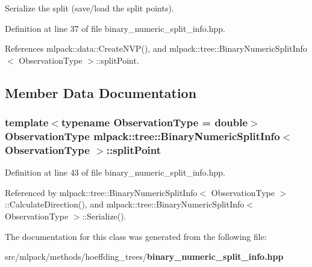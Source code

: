 Serialize the split (save/load the split points). 



Definition at line 37 of file binary\+\_\+numeric\+\_\+split\+\_\+info.\+hpp.



References mlpack\+::data\+::\+Create\+N\+V\+P(), and mlpack\+::tree\+::\+Binary\+Numeric\+Split\+Info$<$ Observation\+Type $>$\+::split\+Point.



\subsection{Member Data Documentation}
\subsubsection[{split\+Point}]{\setlength{\rightskip}{0pt plus 5cm}template$<$typename Observation\+Type  = double$>$ Observation\+Type {\bf mlpack\+::tree\+::\+Binary\+Numeric\+Split\+Info}$<$ Observation\+Type $>$\+::split\+Point\hspace{0.3cm}{\ttfamily [private]}}\label{classmlpack_1_1tree_1_1BinaryNumericSplitInfo_a8a9e60822acfbcdd7bec5a18a95d2c10}


Definition at line 43 of file binary\+\_\+numeric\+\_\+split\+\_\+info.\+hpp.



Referenced by mlpack\+::tree\+::\+Binary\+Numeric\+Split\+Info$<$ Observation\+Type $>$\+::\+Calculate\+Direction(), and mlpack\+::tree\+::\+Binary\+Numeric\+Split\+Info$<$ Observation\+Type $>$\+::\+Serialize().



The documentation for this class was generated from the following file\+:\begin{DoxyCompactItemize}
\item 
src/mlpack/methods/hoeffding\+\_\+trees/{\bf binary\+\_\+numeric\+\_\+split\+\_\+info.\+hpp}\end{DoxyCompactItemize}
